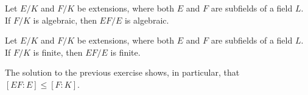 \begin{exercise}
	Let $E/K$ and $F/K$ be extensions, where both $E$ and $F$ are subfields of 
	a field $L$. If $F/K$ is algebraic, then $EF/E$ is algebraic.
\end{exercise}


\begin{exercise}
	Let $E/K$ and $F/K$ be extensions, where both $E$ and $F$ are subfields of 
	a field $L$. If $F/K$ is finite, then $EF/E$ is finite.
\end{exercise}

The solution to the previous exercise shows, in particular, that $[EF:E]\leq [F:K]$. 



%
%
%





